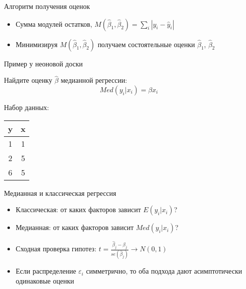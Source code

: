 \documentclass[ignorenonframetext,]{beamer}
\newcommand{\e}{\varepsilon}
\newcommand{\hy}{\hat{y}}
\newcommand{\hb}{\hat{\beta}}
\begin{document}
\begin{frame}{Алгоритм получения оценок}

\begin{itemize}
\item
  Сумма модулей остатков, \(M(\hb_1,\hb_2)=\sum_i |y_i - \hy_i|\)
\item
  Минимизируя \(M(\hb_1,\hb_2)\) получаем состоятельные оценки
  \(\hb_1\), \(\hb_2\)
\end{itemize}

\end{frame}

\begin{frame}{Пример у неоновой доски}

Найдите оценку \(\hb\) медианной регрессии: \[
Med(y_i|x_i)=\beta x_i
\]

Набор данных:

\begin{longtable}[c]{@{}cc@{}}
\toprule
\begin{minipage}[b]{0.05\columnwidth}\centering\strut
y
\strut\end{minipage} &
\begin{minipage}[b]{0.05\columnwidth}\centering\strut
x
\strut\end{minipage}\tabularnewline
\midrule
\endhead
\begin{minipage}[t]{0.05\columnwidth}\centering\strut
1
\strut\end{minipage} &
\begin{minipage}[t]{0.05\columnwidth}\centering\strut
1
\strut\end{minipage}\tabularnewline
\begin{minipage}[t]{0.05\columnwidth}\centering\strut
2
\strut\end{minipage} &
\begin{minipage}[t]{0.05\columnwidth}\centering\strut
5
\strut\end{minipage}\tabularnewline
\begin{minipage}[t]{0.05\columnwidth}\centering\strut
6
\strut\end{minipage} &
\begin{minipage}[t]{0.05\columnwidth}\centering\strut
5
\strut\end{minipage}\tabularnewline
\bottomrule
\end{longtable}

\end{frame}

\begin{frame}{Медианная и классическая регрессия}

\begin{itemize}
\item
  Классическая: от каких факторов зависит \(E(y_i|x_i)\)?
\item
  Медианная: от каких факторов зависит \(Med(y_i|x_i)\)?
\item
  Сходная проверка гипотез:
  \(t=\frac{\hat{\beta}_j-\beta_j}{se(\hat{\beta}_j)} \to N(0,1)\)
\item
  Если распределение \(\e_i\) симметрично, то оба подхода дают
  асимптотически одинаковые оценки
\end{itemize}

\end{frame}
\end{document}
